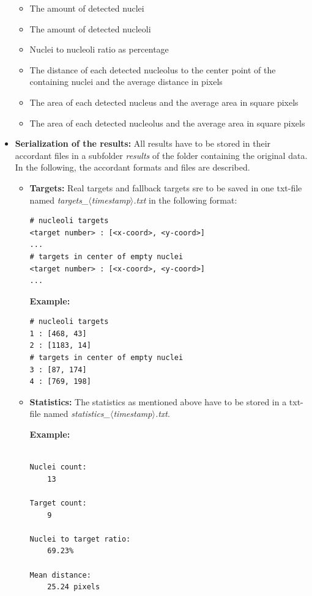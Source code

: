 \documentclass[a4paper, 11pt]{article}
\begin{document}
\begin{itemize}
\begin{itemize}
    \item The amount of detected nuclei
    \item The amount of detected nucleoli
    \item Nuclei to nucleoli ratio as percentage
    \item The distance of each detected nucleolus to the center point of the
    containing nuclei and the average distance in pixels
    \item The area of each detected nucleus and the average area in square
    pixels
    \item The area of each detected nucleolus and the average area in square
    pixels
  \end{itemize}
  \item \textbf{Serialization of the results:} All results have to be stored in
  their accordant files in a subfolder \textit{results} of the folder
  containing the original data. In the following, the accordant formats and
  files are described.
  \begin{itemize}
  	\item \textbf{Targets:} Real targets and fallback targets sre to be saved in
  	one txt-file named \textit{targets\_$\langle$timestamp$\rangle$.txt} in the
  	following format:
\begin{lstlisting}[frame=single, caption=Format of results txt-file]
# nucleoli targets
<target number> : [<x-coord>, <y-coord>]
...
# targets in center of empty nuclei
<target number> : [<x-coord>, <y-coord>]
...
\end{lstlisting}

		\textbf{Example:}
\begin{lstlisting}[frame=single, caption=Example of results file]
# nucleoli targets
1 : [468, 43]
2 : [1183, 14]
# targets in center of empty nuclei
3 : [87, 174]
4 : [769, 198]
\end{lstlisting}
  	\item \textbf{Statistics:} The statistics as mentioned above have to be
  	stored in a txt-file named   
  	\textit{statistics\_$\langle$timestamp$\rangle$.txt}.

  	\textbf{Example:}
\begin{lstlisting}[frame=single, caption=Example of statistics file]

Nuclei count: 
	13

Target count: 
	9

Nuclei to target ratio: 
	69.23%

Mean distance: 
	25.24 pixels


\end{lstlisting}
\end{itemize}
\end{itemize}
\end{document}
